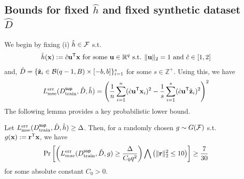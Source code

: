 \subsection{Bounds for fixed $\hat{h}$ and fixed synthetic dataset $\hat{D}$} 
We begin by fixing (i) $\hat{h} \in \mathcal{F}$ s.t. 
\begin{equation}
    \hat{h}({\mathbf{x}}) := \hat{c}{\mathbf{u}}^{\sf T}{\mathbf{x}} \textnormal{ for some } {\mathbf{u}} \in \mathbb{R}^q \textnormal{ s.t. } \|{\mathbf{u}}\|_2 = 1 \textnormal{ and } \hat{c} \in [1,2] \label{eqn:hath}
\end{equation}
and, $\hat{D} = \{\hat{{\mathbf{z}}}_i \in \mathcal{B}(q-1, B) \times [-b, b]\}_{i=1}^s$ for some $s \in \mathbb{Z}^+$. Using this, we have
\begin{equation}
    L^{\textnormal{err}}_{\textnormal{mse}}(D^{\sf sup}_{\textnormal{train}}, \hat{D}, \hat{h}) = \left(\frac{1}{n}\sum_{i=1}^n(\hat{c}{\mathbf{u}}^{\sf T}{\mathbf{x}}_i)^2-\frac{1}{s}\sum_{i=1}^s(\hat{c}{\mathbf{u}}^{\sf T}\hat{{\mathbf{z}}}_i)^2\right)^2  \label{eqn:Lossu}
\end{equation}
The following lemma provides a key probabilistic lower bound.
\begin{lemma} \label{lem:probbd}
    Let $L^{\textnormal{err}}_{\textnormal{mse}}(D^{\sf sup}_{\textnormal{train}}, \hat{D}, \hat{h})  \geq \Delta$. %
    Then, for a randomly chosen $g \sim G(\mathcal{F})$ s.t. $g({\mathbf{x}}) := {\mathbf{r}}^{\sf T}{\mathbf{x}}$, we have
    \[
        \Pr\left[\left(L^{\textnormal{err}}_{mse}(D^{\sf sup}_{\textnormal{train}}, \hat{D}, g)  \geq \frac{\Delta}{C_0q^2}\right)\bigwedge\left(\|{\mathbf{r}}\|_2^2 \leq 10\right)\right] \geq \frac{7}{30}
    \]
    for some absolute constant $C_0 > 0$. 
\end{lemma}
